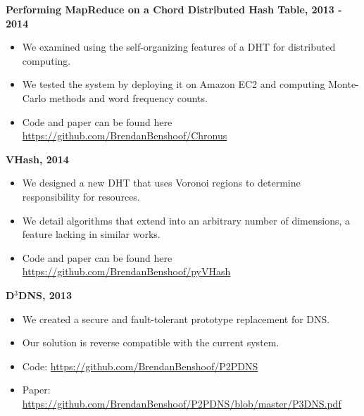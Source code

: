 \documentclass{res}
\begin{document}
\begin{resume}
{\bf Performing MapReduce on a Chord Distributed Hash Table, 2013 - 2014}
    \begin{itemize}
    \item We examined using the self-organizing features of a DHT for distributed computing.
    \item We tested the system by deploying it on Amazon EC2 and computing Monte-Carlo methods and word frequency counts. 
    \item Code and paper can be found here \url{https://github.com/BrendanBenshoof/Chronus}
    \end{itemize}
    
{\bf VHash, 2014}
    \begin{itemize}
    \item We designed a new DHT that uses Voronoi regions to determine responsibility for resources.
    \item We detail algorithms that extend into an arbitrary number of dimensions, a feature lacking in similar works.
    \item Code and paper can be found here \url{https://github.com/BrendanBenshoof/pyVHash}
    \end{itemize}   


{\bf D$^3$DNS, 2013 }
    \begin{itemize}
    \item We created a secure and fault-tolerant prototype replacement for DNS.
    \item Our solution is reverse compatible with the current system.
    \item Code: \url{https://github.com/BrendanBenshoof/P2PDNS}
    \item Paper: \url{https://github.com/BrendanBenshoof/P2PDNS/blob/master/P3DNS.pdf}
    \end{itemize}

 
%    




\end{resume}
\end{document}
